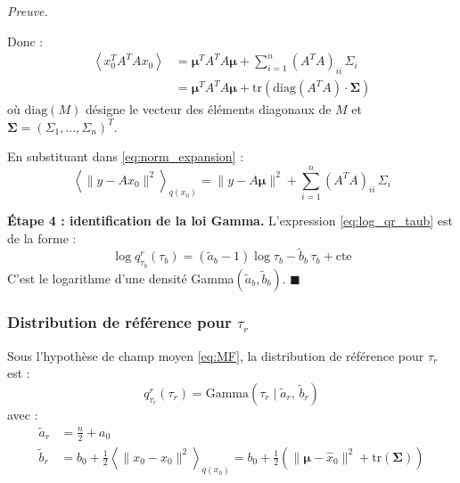 \documentclass[12pt]{article}
\renewcommand{\qedsymbol}{$\blacksquare$}
\renewenvironment{proof}[1][\proofname]{%
  \par\medskip\noindent
  \textit{\color{proofgray}#1.}\enspace\ignorespaces
}{\hfill\qedsymbol\par\medskip}
\renewcommand{\proofname}{Preuve}
\begin{document}
\begin{proof}
Donc :
\begin{align}
    \left\langle x_0^T A^T A x_0 \right\rangle &= \boldsymbol{\mu}^T A^T A \boldsymbol{\mu} + \sum_{i=1}^n (A^T A)_{ii}\, \Sigma_i \nonumber\\[4pt]
    &= \boldsymbol{\mu}^T A^T A \boldsymbol{\mu} + \mathrm{tr}\!\left(\mathrm{diag}(A^T A) \cdot \boldsymbol{\Sigma}\right) \label{eq:quadratic_mean}
\end{align}
où $\mathrm{diag}(M)$ désigne le vecteur des éléments diagonaux de $M$ et $\boldsymbol{\Sigma} = (\Sigma_1, \ldots, \Sigma_n)^T$.

En substituant dans \eqref{eq:norm_expansion} :
\begin{equation}
    \left\langle \|y - Ax_0\|^2 \right\rangle_{q(x_0)} = \|y - A\boldsymbol{\mu}\|^2 + \sum_{i=1}^n (A^T A)_{ii}\, \Sigma_i
    \label{eq:expected_residual}
\end{equation}

\textbf{Étape 4 : identification de la loi Gamma.} L'expression \eqref{eq:log_qr_taub} est de la forme :
\[
\log q_{\tau_b}^r(\tau_b) = (\tilde{a}_b - 1)\log\tau_b - \tilde{b}_b\, \tau_b + \mathrm{cte}
\]
C'est le logarithme d'une densité Gamma$(\tilde{a}_b, \tilde{b}_b)$.
\end{proof}


\subsubsection{Distribution de référence pour $\tau_r$}

\begin{propositionbox}
\label{prop:qr_taur}
Sous l'hypothèse de champ moyen \eqref{eq:MF}, la distribution de référence pour $\tau_r$ est :
\begin{equation}
    \boxed{q_{\tau_r}^r(\tau_r) = \mathrm{Gamma}(\tau_r \mid \tilde{a}_r,\, \tilde{b}_r)}
\end{equation}
avec :
\begin{align}
    \tilde{a}_r &= \frac{n}{2} + a_0 \label{eq:atilde_r}\\[4pt]
    \tilde{b}_r &= b_0 + \frac{1}{2}\left\langle \|x_0 - \hat{x}_0\|^2 \right\rangle_{q(x_0)} = b_0 + \frac{1}{2}\left(\|\boldsymbol{\mu} - \hat{x}_0\|^2 + \mathrm{tr}(\boldsymbol{\Sigma})\right) \label{eq:btilde_r}
\end{align}
\end{propositionbox}
\end{document}
